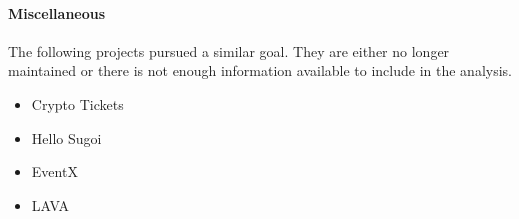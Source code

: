 \paragraph{Miscellaneous}
The following projects pursued a similar goal. They are either no longer maintained or there is not enough information available to include in the analysis.

\begin{itemize}
    \item Crypto Tickets
    \item Hello Sugoi
    \item EventX
    \item LAVA
\end{itemize}
